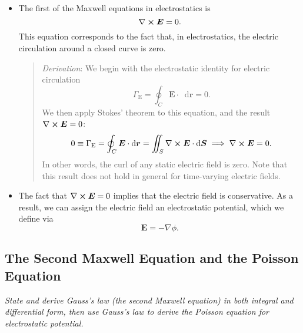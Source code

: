\documentclass[11pt, a4paper]{article}
\newcommand{\diff}{\mathop{}\!\mathrm{d}} %
\renewcommand{\vec}[1]{\bm{#1}} %
\renewcommand{\r}{\vec{r}}
\newcommand{\E}{\vec{E}} %
\renewcommand{\curl}{\nabla \cross}
\renewcommand{\grad}{\nabla}
\begin{document}
\begin{itemize}
    \item The first of the Maxwell equations in electrostatics is
    \begin{equation*}
        \curl \E = 0.
    \end{equation*}
    This equation corresponds to the fact that, in electrostatics, the electric circulation around a closed curve is zero.
    \begin{quote}
        \textit{Derivation}: We begin with the electrostatic identity for electric circulation
    \begin{equation*}
        \Gamma_{\text{E}} = \oint_{C} \E \cdot \diff \r = 0.
    \end{equation*}
    We then apply Stokes' theorem to this equation, and the result $ \curl \E = 0 $:
    \begin{equation*}
        0 \equiv \Gamma_{\text{E}} = \oint_{C}\E \cdot \diff \r = \iint_{S} \curl \E \cdot \diff \vec{S} \implies \curl \E = 0.
    \end{equation*}
    In other words, the curl of any static electric field is zero. Note that this result does not hold in general for time-varying electric fields.
    \end{quote}

    \item The fact that $ \curl \E = 0 $ implies that the electric field is conservative. As a result, we can assign the electric field an electrostatic potential, which we define via
    \begin{equation*}
        \E = - \grad \phi.
    \end{equation*}
    
\end{itemize}

\subsection{The Second Maxwell Equation and the Poisson Equation}
\textit{State and derive Gauss's law (the second Maxwell equation) in both integral and differential form, then use Gauss's law to derive the Poisson equation for electrostatic potential.}
\end{document}
